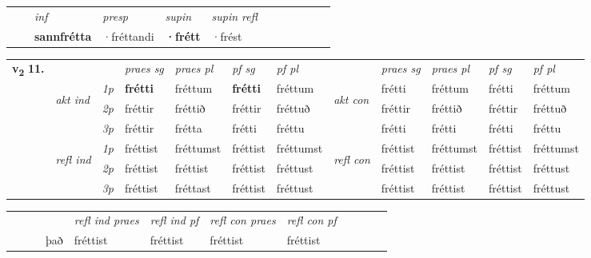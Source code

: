 \begin{tabular}{llllllllllll}
 & & \textit{inf}     & \textit{presp} & \textit{supin} & \textit{supin refl}      \\*
  & & \textbf{sannfrétta}      & ·fréttandi &  \textbf{·frétt} & ·frést  \\*
\cmidrule{1-12}
\end{tabular}



\begin{tabular}{llllllllllll} \toprule
\multirow{4}{*}{{{\textbf{v{\textsubscript{2}}} \Large{\textbf{11.}}}}}  & &   &  \textit{praes sg}  & \textit{praes pl}  &\textit{ pf sg} & \textit{pf pl} &  &  \textit{praes sg}  & \textit{praes pl}  & \textit{pf sg} & \textit{pf pl } \\*
	\cmidrule{4-7} \cmidrule{9-12}
 & \multirow{3}{*}{\begin{turn}{90}\textit{akt ind}\end{turn}} & {\textit{1p}} & \textbf{frétti} & fréttum    & \textbf{frétti} & fréttum & \multirow{3}{*}{\begin{turn}{90}\textit{akt con}\end{turn}} &frétti & fréttum & frétti & fréttum\\*
& &  {\textit{2p}} &  fréttir  & fréttið   & fréttir & fréttuð & & fréttir & fréttið & fréttir & fréttuð \\*
& &  {\textit{3p}} & fréttir & frétta   & frétti & fréttu & & frétti & frétti& frétti & fréttu  \\*
\cmidrule{4-7} \cmidrule{9-12}
 &\multirow{3}{*}{\begin{turn}{90}\textit{refl ind}\end{turn}} & {\textit{1p}} & fréttist & fréttumst    & fréttist & fréttumst & \multirow{3}{*}{\begin{turn}{90}\textit{refl con}\end{turn}}  &fréttist & fréttumst & fréttist & fréttumst\\*
 &&  {\textit{2p}} &  fréttist  & fréttist   & fréttist & fréttust & &fréttist & fréttist & fréttist & fréttust \\*
& &  {\textit{3p}} & fréttist & fréttast   & fréttist & fréttust & & fréttist & fréttist& fréttist & fréttust  \\*
\cmidrule{4-7} \cmidrule{9-12}
\end{tabular}


\begin{tabular}{llllllllllll}
 & &  & &  \textit{refl ind praes} & \textit{refl ind pf} & \textit{refl con praes} & \textit{refl con pf} \\*
 & &  & það & fréttist & fréttist & fréttist & fréttist \\*
\cmidrule{5-9}
\end{tabular}


